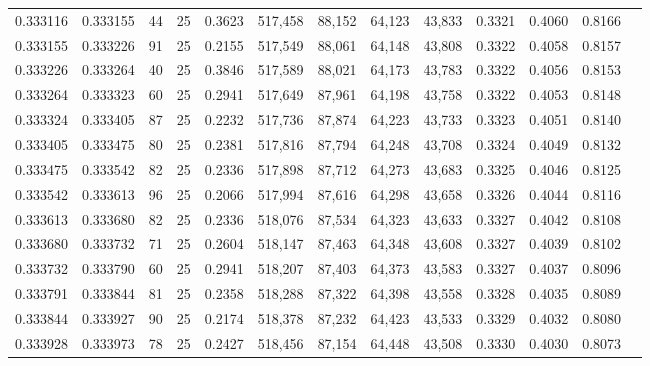 \begin{tabular}{rrrrrrrrrrrrr}
0.333116 & 0.333155 &    44 &  25 &                                     0.3623 & 517,458 &  88,152 &  64,123 &  43,833 & 0.3321 & 0.4060 & 0.8166 \\
0.333155 & 0.333226 &    91 &  25 &                                     0.2155 & 517,549 &  88,061 &  64,148 &  43,808 & 0.3322 & 0.4058 & 0.8157 \\
0.333226 & 0.333264 &    40 &  25 &                                     0.3846 & 517,589 &  88,021 &  64,173 &  43,783 & 0.3322 & 0.4056 & 0.8153 \\
0.333264 & 0.333323 &    60 &  25 &                                     0.2941 & 517,649 &  87,961 &  64,198 &  43,758 & 0.3322 & 0.4053 & 0.8148 \\
0.333324 & 0.333405 &    87 &  25 &                                     0.2232 & 517,736 &  87,874 &  64,223 &  43,733 & 0.3323 & 0.4051 & 0.8140 \\
0.333405 & 0.333475 &    80 &  25 &                                     0.2381 & 517,816 &  87,794 &  64,248 &  43,708 & 0.3324 & 0.4049 & 0.8132 \\
0.333475 & 0.333542 &    82 &  25 &                                     0.2336 & 517,898 &  87,712 &  64,273 &  43,683 & 0.3325 & 0.4046 & 0.8125 \\
0.333542 & 0.333613 &    96 &  25 &                                     0.2066 & 517,994 &  87,616 &  64,298 &  43,658 & 0.3326 & 0.4044 & 0.8116 \\
0.333613 & 0.333680 &    82 &  25 &                                     0.2336 & 518,076 &  87,534 &  64,323 &  43,633 & 0.3327 & 0.4042 & 0.8108 \\
0.333680 & 0.333732 &    71 &  25 &                                     0.2604 & 518,147 &  87,463 &  64,348 &  43,608 & 0.3327 & 0.4039 & 0.8102 \\
0.333732 & 0.333790 &    60 &  25 &                                     0.2941 & 518,207 &  87,403 &  64,373 &  43,583 & 0.3327 & 0.4037 & 0.8096 \\
0.333791 & 0.333844 &    81 &  25 &                                     0.2358 & 518,288 &  87,322 &  64,398 &  43,558 & 0.3328 & 0.4035 & 0.8089 \\
0.333844 & 0.333927 &    90 &  25 &                                     0.2174 & 518,378 &  87,232 &  64,423 &  43,533 & 0.3329 & 0.4032 & 0.8080 \\
0.333928 & 0.333973 &    78 &  25 &                                     0.2427 & 518,456 &  87,154 &  64,448 &  43,508 & 0.3330 & 0.4030 & 0.8073 \\

\end{tabular}
